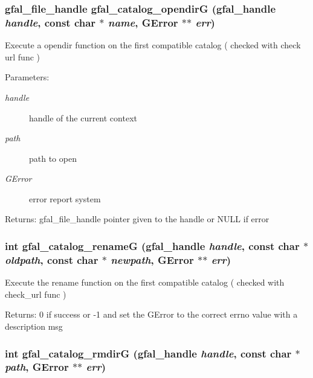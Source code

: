 \subsubsection{\setlength{\rightskip}{0pt plus 5cm}gfal\_\-file\_\-handle gfal\_\-catalog\_\-opendir\-G (gfal\_\-handle {\em handle}, const char $\ast$ {\em name}, GError $\ast$$\ast$ {\em err})}\label{gfal__common__catalog_8c_eb89b1d37a16ef8ecb50ac603366285c}


Execute a opendir function on the first compatible catalog ( checked with check url func ) \begin{Desc}
\item[Parameters:]
\begin{description}
\item[{\em handle}]handle of the current context \item[{\em path}]path to open \item[{\em GError}]error report system \end{description}
\end{Desc}
\begin{Desc}
\item[Returns:]gfal\_\-file\_\-handle pointer given to the handle or NULL if error \end{Desc}
\subsubsection{\setlength{\rightskip}{0pt plus 5cm}int gfal\_\-catalog\_\-rename\-G (gfal\_\-handle {\em handle}, const char $\ast$ {\em oldpath}, const char $\ast$ {\em newpath}, GError $\ast$$\ast$ {\em err})}\label{gfal__common__catalog_8c_99ffb13510951a6fe79f3c33305ea189}


Execute the rename function on the first compatible catalog ( checked with check\_\-url func ) \begin{Desc}
\item[Returns:]0 if success or -1 and set the GError to the correct errno value with a description msg \end{Desc}
\subsubsection{\setlength{\rightskip}{0pt plus 5cm}int gfal\_\-catalog\_\-rmdir\-G (gfal\_\-handle {\em handle}, const char $\ast$ {\em path}, GError $\ast$$\ast$ {\em err})}\label{gfal__common__catalog_8c_9cd4da87728df80003fe8618c4f63e13}


